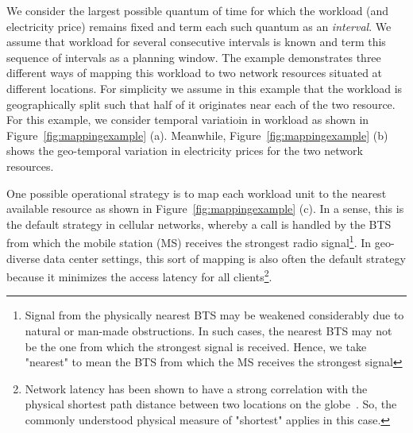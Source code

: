 We consider the largest possible quantum of time for which the workload (and electricity price) remains fixed and term each such quantum as an \textit{interval}. We assume that workload for several consecutive intervals is known and term this sequence of intervals as a planning window.   The example demonstrates three different ways of mapping this workload to two network resources situated at different locations. For simplicity we assume in this example that the workload is geographically split such that half of it originates near each of the two resource. For this example, we consider temporal variatioin in workload as shown in Figure~\ref{fig:mappingexample} (a). Meanwhile, Figure~\ref{fig:mappingexample} (b) shows the geo-temporal variation in electricity prices for the two network resources.


One possible operational strategy is to map each workload unit to the nearest available resource as shown in Figure~\ref{fig:mappingexample} (c). In a sense, this is the default strategy in cellular networks, whereby a call is handled by the BTS from which the mobile station (MS) receives the strongest radio signal\footnote{Signal from the physically nearest BTS may be weakened considerably due to natural or man-made obstructions. In such cases, the nearest BTS may not be the one from which the strongest signal is received. Hence, we take "nearest" to mean the BTS from which the MS receives the strongest signal}. In geo-diverse data center settings, this sort of mapping is also often the default strategy because it minimizes the access latency for all clients\footnote{Network latency has been shown to have a strong correlation with the physical shortest path distance between two locations on the globe~\cite{dina:p2pdelay:infocom:2004}. So, the commonly understood physical measure of "shortest" applies in this case.}. 

